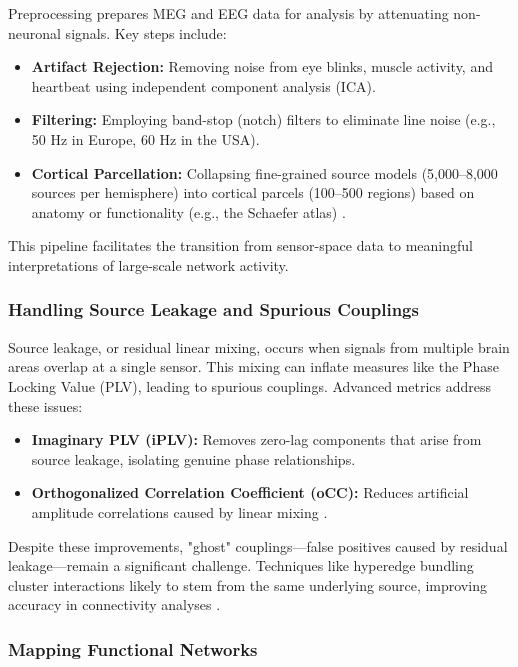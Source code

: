 Preprocessing prepares MEG and EEG data for analysis by attenuating non-neuronal signals. Key steps include:
\begin{itemize}
    \item \textbf{Artifact Rejection:} Removing noise from eye blinks, muscle activity, and heartbeat using independent component analysis (ICA).
    \item \textbf{Filtering:} Employing band-stop (notch) filters to eliminate line noise (e.g., 50 Hz in Europe, 60 Hz in the USA).
    \item \textbf{Cortical Parcellation:} Collapsing fine-grained source models (5,000–8,000 sources per hemisphere) into cortical parcels (100–500 regions) based on anatomy or functionality (e.g., the Schaefer atlas) \cite{lobier2017functional}.
\end{itemize}

This pipeline facilitates the transition from sensor-space data to meaningful interpretations of large-scale network activity.

\subsubsection*{Handling Source Leakage and Spurious Couplings}

Source leakage, or residual linear mixing, occurs when signals from multiple brain areas overlap at a single sensor. This mixing can inflate measures like the Phase Locking Value (PLV), leading to spurious couplings. Advanced metrics address these issues:
\begin{itemize}
    \item \textbf{Imaginary PLV (iPLV):} Removes zero-lag components that arise from source leakage, isolating genuine phase relationships.
    \item \textbf{Orthogonalized Correlation Coefficient (oCC):} Reduces artificial amplitude correlations caused by linear mixing \cite{hipp2012functional}.
\end{itemize}

Despite these improvements, "ghost" couplings—false positives caused by residual leakage—remain a significant challenge. Techniques like hyperedge bundling cluster interactions likely to stem from the same underlying source, improving accuracy in connectivity analyses \cite{wang2018hyperedge}.

\subsubsection*{Mapping Functional Networks}

